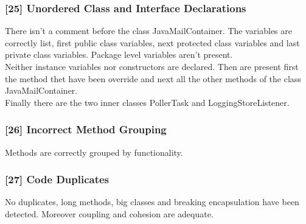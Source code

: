 \subsubsection{[25] Unordered Class and Interface Declarations}

There isn't a comment before the class JavaMailContainer. 
The variables are correctly list, first public class variables, next protected class variables and last private class variables. Package level variables aren't present.
\\Neither instance variables nor constructors are declared. Then are present first the method thet have been override and next all the other methods of the class JavaMailContainer. 
\\Finally there are the two inner classes PollerTask and LoggingStoreListener.


\subsubsection{[26] Incorrect Method Grouping}
Methods are correctly grouped by functionality.

\subsubsection{[27] Code Duplicates}
No duplicates, long methods, big classes and breaking encapsulation have been detected.
Moreover coupling and cohesion are adequate.